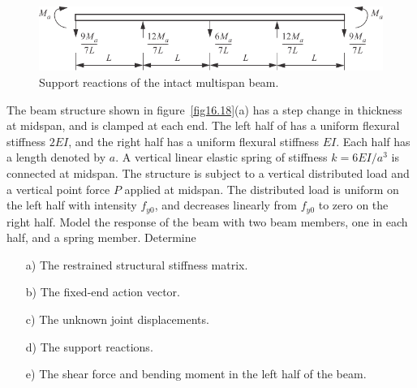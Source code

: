 \documentclass{AeroStructure-ERJohnson}
\begin{document}
\begin{figure}[!h]
\centerline{\includegraphics{Figure_16-17.pdf}}
\caption{Support reactions of the intact multispan beam.}\label{fig16.17}
\end{figure}

\begin{example*}\label{ex16.7}The beam structure shown in figure~\ref{fig16.18}(a) has a step change in thickness at midspan, and is clamped at each end. The left half of has a uniform flexural stiffness $2 E I$, and the right half has a uniform flexural stiffness $E I$. Each half has a length denoted by $a$. A vertical linear elastic spring of stiffness $k=6 E I / a^{3}$ is connected at midspan. The structure is subject to a vertical distributed load and a vertical point force $P$ applied at midspan. The distributed load is uniform on the left half with intensity $f_{y 0}$, and decreases linearly from $f_{y 0}$ to zero on the right half. Model the response of the beam with two beam members, one in each half, and a spring member. Determine\pagebreak

\begin{enumerate}
\item[a)] The restrained structural stiffness matrix.

\item[b)] The fixed-end action vector.

\item[c)] The unknown joint displacements.

\item[d)] The support reactions.

\item[e)] The shear force and bending moment in the left half of the beam.
\end{enumerate}



\end{example*}
\end{document}
